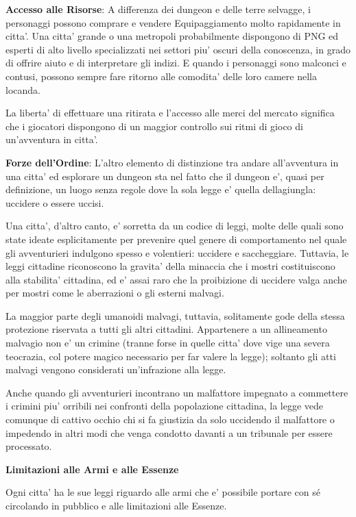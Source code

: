 \documentclass[a4paper,11pt,twoside,openany]{dndbook}
\begin{document}
\textbf{Accesso alle Risorse}: A differenza dei dungeon e delle terre selvagge, i personaggi possono comprare e vendere Equipaggiamento molto rapidamente in citta'. Una citta' grande o una metropoli probabilmente dispongono di PNG ed esperti di alto livello specializzati nei settori piu' oscuri della conoscenza, in grado di offrire aiuto e di interpretare gli indizi. E quando i personaggi sono malconci e contusi, possono sempre fare ritorno alle comodita' delle loro camere nella locanda.

La liberta' di effettuare una ritirata e l'accesso alle merci del mercato significa che i giocatori dispongono di un maggior controllo sui ritmi di gioco di un'avventura in citta'.

\textbf{Forze dell'Ordine}: L'altro elemento di distinzione tra andare all'avventura in una citta' ed esplorare un dungeon sta nel fatto che il dungeon e', quasi per definizione, un luogo senza regole dove la sola legge e' quella dellagiungla: uccidere o essere uccisi.

Una citta', d'altro canto, e' sorretta da un codice di leggi, molte delle quali sono state ideate esplicitamente per prevenire quel genere di comportamento nel quale gli avventurieri indulgono spesso e volentieri: uccidere e saccheggiare. Tuttavia, le leggi cittadine riconoscono la gravita' della minaccia che i mostri costituiscono alla stabilita' cittadina, ed e' assai raro che la proibizione di uccidere valga anche per mostri come le aberrazioni o gli esterni malvagi.

La maggior parte degli umanoidi malvagi, tuttavia, solitamente gode della stessa protezione riservata a tutti gli altri cittadini. Appartenere a un allineamento malvagio non e' un crimine (tranne forse in quelle citta' dove vige una severa teocrazia, col potere magico necessario per far valere la legge); soltanto gli atti malvagi vengono considerati un'infrazione alla legge. 

Anche quando gli avventurieri incontrano un malfattore impegnato a commettere i crimini piu' orribili nei confronti della popolazione cittadina, la legge vede comunque di cattivo occhio chi si fa giustizia da solo uccidendo il malfattore o impedendo in altri modi che venga condotto davanti a un tribunale per essere processato.

\textbf{Limitazioni alle Armi e alle Essenze}

Ogni citta' ha le sue leggi riguardo alle armi che e' possibile portare con sé circolando in pubblico e alle limitazioni alle Essenze.
\end{document}
